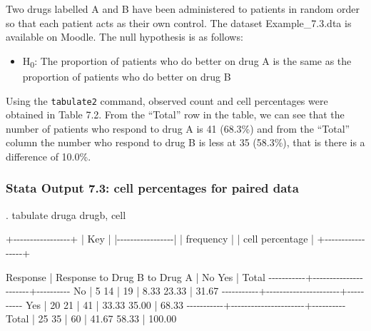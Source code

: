 \documentclass[
]{memoir}
\newenvironment{Shaded}{\begin{snugshade}}{\end{snugshade}}
\newcommand{\NormalTok}[1]{#1}
\providecommand{\tightlist}{%
  \setlength{\itemsep}{0pt}\setlength{\parskip}{0pt}}
\begin{document}
Two drugs labelled A and B have been administered to patients in random order so that each patient acts as their own control. The dataset Example\_7.3.dta is available on Moodle. The null hypothesis is as follows:

\begin{itemize}
\tightlist
\item
  H\textsubscript{0}: The proportion of patients who do better on drug A is the same as the proportion of patients who do better on drug B
\end{itemize}

Using the \texttt{tabulate2} command, observed count and cell percentages were obtained in Table 7.2. From the ``Total'' row in the table, we can see that the number of patients who respond to drug A is 41 (68.3\%) and from the ``Total'' column the number who respond to drug B is less at 35 (58.3\%), that is there is a difference of 10.0\%.

\hypertarget{stata-output-7.3-cell-percentages-for-paired-data}{%
\subsubsection*{Stata Output 7.3: cell percentages for paired data}\label{stata-output-7.3-cell-percentages-for-paired-data}}

\begin{Shaded}
\begin{Highlighting}[]
\NormalTok{. tabulate druga drugb, cell}

\NormalTok{+{-}{-}{-}{-}{-}{-}{-}{-}{-}{-}{-}{-}{-}{-}{-}{-}{-}+}
\NormalTok{| Key             |}
\NormalTok{|{-}{-}{-}{-}{-}{-}{-}{-}{-}{-}{-}{-}{-}{-}{-}{-}{-}|}
\NormalTok{|    frequency    |}
\NormalTok{| cell percentage |}
\NormalTok{+{-}{-}{-}{-}{-}{-}{-}{-}{-}{-}{-}{-}{-}{-}{-}{-}{-}+}

\NormalTok{  Response |  Response to Drug B}
\NormalTok{ to Drug A |        No        Yes |     Total}
\NormalTok{{-}{-}{-}{-}{-}{-}{-}{-}{-}{-}{-}+{-}{-}{-}{-}{-}{-}{-}{-}{-}{-}{-}{-}{-}{-}{-}{-}{-}{-}{-}{-}{-}{-}+{-}{-}{-}{-}{-}{-}{-}{-}{-}{-}}
\NormalTok{        No |         5         14 |        19 }
\NormalTok{           |      8.33      23.33 |     31.67 }
\NormalTok{{-}{-}{-}{-}{-}{-}{-}{-}{-}{-}{-}+{-}{-}{-}{-}{-}{-}{-}{-}{-}{-}{-}{-}{-}{-}{-}{-}{-}{-}{-}{-}{-}{-}+{-}{-}{-}{-}{-}{-}{-}{-}{-}{-}}
\NormalTok{       Yes |        20         21 |        41 }
\NormalTok{           |     33.33      35.00 |     68.33 }
\NormalTok{{-}{-}{-}{-}{-}{-}{-}{-}{-}{-}{-}+{-}{-}{-}{-}{-}{-}{-}{-}{-}{-}{-}{-}{-}{-}{-}{-}{-}{-}{-}{-}{-}{-}+{-}{-}{-}{-}{-}{-}{-}{-}{-}{-}}
\NormalTok{     Total |        25         35 |        60 }
\NormalTok{           |     41.67      58.33 |    100.00 }
\end{Highlighting}
\end{Shaded}
\end{document}
